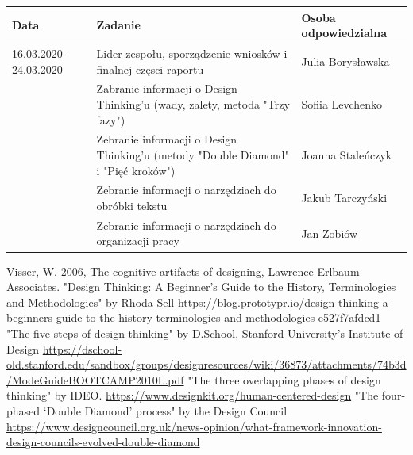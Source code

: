 \documentclass[a4paper,titleauthor]{mwart}
\begin{document}
\begin{tabular}{|p{2cm}|p{9cm}|p{3.5cm}|} \hline
Data & Zadanie & Osoba odpowiedzialna \\
\hline
16.03.2020 - 24.03.2020 & Lider zespołu, sporządzenie wniosków  i finalnej częsci raportu & Julia Borysławska \\
\hline
 & Zabranie informacji o Design Thinking'u (wady, zalety, metoda "Trzy fazy") & Sofiia Levchenko\\
\hline
& Zebranie informacji o Design Thinking'u (metody "Double Diamond" i "Pięć kroków") & Joanna Staleńczyk \\
\hline
& Zebranie informacji o narzędziach do obróbki tekstu & Jakub Tarczyński \\
\hline
& Zebranie informacji o narzędziach do organizacji pracy  & Jan Zobiów \\ 

\hline

\end{tabular}





\begin{thebibliography}{SYCYfProjekt}
 Visser, W. 2006, The cognitive artifacts of designing, Lawrence Erlbaum Associates.
"Design Thinking: A Beginner’s Guide to the History, Terminologies and Methodologies" by Rhoda Sell \url{https://blog.prototypr.io/design-thinking-a-beginners-guide-to-the-history-terminologies-and-methodologies-e527f7afdcd1}
"The five steps of design thinking" by D.School, Stanford University’s Institute of Design \url{https://dschool-old.stanford.edu/sandbox/groups/designresources/wiki/36873/attachments/74b3d/ModeGuideBOOTCAMP2010L.pdf}
"The three overlapping phases of design thinking" by IDEO. \url{https://www.designkit.org/human-centered-design}
"The four-phased ‘Double Diamond’ process" by the Design Council \url{https://www.designcouncil.org.uk/news-opinion/what-framework-innovation-design-councils-evolved-double-diamond}
\end{thebibliography}
\end{document}
